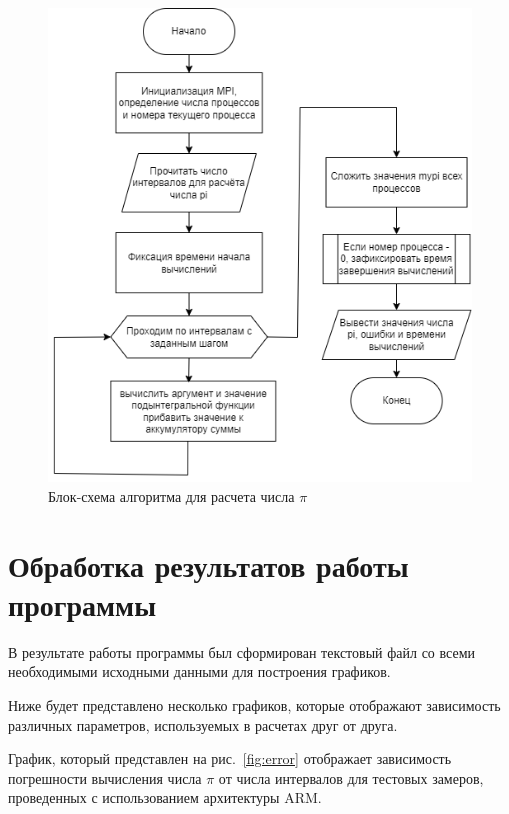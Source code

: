\documentclass{altsu-bachelor}
\begin{document}
\begin{figure}[H]
    \centering
    \includegraphics[scale=0.8]{icpi_block.png}
    \caption{Блок-схема алгоритма для расчета числа $\pi$}
    \label{fig:mpi}
\end{figure}

\section*{Обработка результатов работы программы}

В результате работы программы был сформирован текстовый файл со всеми необходимыми исходными данными для построения графиков.

Ниже будет представлено несколько графиков, которые отображают зависимость различных параметров, используемых в расчетах друг от друга.

График, который представлен на рис.~\ref{fig:error} отображает зависимость погрешности вычисления числа $\pi$ от числа интервалов для тестовых замеров, проведенных с использованием архитектуры ARM.
\end{document}
